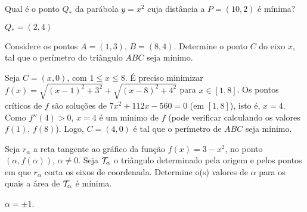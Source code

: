 \begin{exo}
Qual é o ponto $Q_*$ da parábola $y=x^2$ cuja distância a $P=(10,2)$ é
mínima?
\begin{sol}
$Q_*=(2,4)$
\end{sol}
\end{exo}

\begin{exo}
Considere os pontos $A=(1,3)$, $B=(8,4)$. Determine o ponto $C$ do eixo $x$,
tal que o perímetro do triângulo $ABC$ seja mínimo.
\begin{sol}
Seja $C=(x,0)$, com $1\leq x\leq 8$. É preciso minimizar
$f(x)=\sqrt{(x-1)^2+3^2}+\sqrt{(x-8)^2+4^2}$
para $x\in [1,8]$.
Os pontos críticos de $f$ são soluções de $7x^2+112x-560=0$ (em $[1,8]$), isto é,
$x=4$. Como $f''(4)>0$, $x=4$ é um mínimo de $f$ (pode verificar calculando os
valores $f(1)$, $f(8)$).
Logo, $C=(4,0)$ é tal que o perímetro de $ABC$ seja mínimo.
\end{sol}
\end{exo}

\begin{exo}
Seja $r_\alpha$ a reta tangente ao gráfico da função $f(x)=3-x^2$, no ponto
$(\alpha,f(\alpha))$, $\alpha\neq 0$.  
Seja $\mathcal{T}_\alpha$ o triângulo determinado pela origem e pelos pontos em
que $r_\alpha$ corta os eixos de coordenada. Determine o(s) valores de $\alpha$
para os quais a área de $\mathcal{T}_\alpha$ é mínima.
\begin{sol}
$\alpha=\pm 1$.
\end{sol}
\end{exo}

